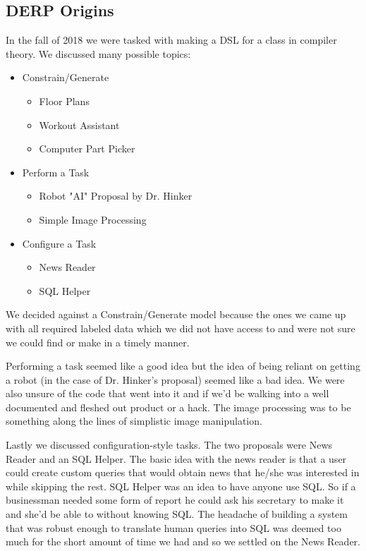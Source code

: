 \documentclass{article}
\begin{document}
\subsection{DERP Origins}
In the fall of 2018 we were tasked with making a DSL for a class in compiler theory. We discussed many possible topics:
\begin{itemize}
    \item{Constrain/Generate}
    \begin{itemize}
        \item{Floor Plans}
        \item{Workout Assistant}
        \item{Computer Part Picker}
    \end{itemize}
    \item{Perform a Task}
    \begin{itemize}
        \item{Robot "AI" Proposal by Dr. Hinker}
        \item{Simple Image Processing}
    \end{itemize}
    \item{Configure a Task}
    \begin{itemize}
        \item{News Reader}
        \item{SQL Helper}        
    \end{itemize}
\end{itemize}

We decided against a Constrain/Generate model because the ones we came up with all required labeled data which we did not have access to and were not sure we could find or make in a timely manner.

Performing a task seemed like a good idea but the idea of being reliant on getting a robot (in the case of Dr. Hinker's proposal) seemed like a bad idea. We were also unsure of the code that went into it and if we'd be walking into a well documented and fleshed out product or a hack. The image processing was to be something along the lines of simplistic image manipulation.

Lastly we discussed configuration-style tasks. The two proposals were News Reader and an SQL Helper. The basic idea with the news reader is that a user could create custom queries that would obtain news that he/she was interested in while skipping the rest. SQL Helper was an idea to have anyone use SQL. So if a businessman needed some form of report he could ask his secretary to make it and she'd be able to without knowing SQL. The headache of building a system that was robust enough to translate human queries into SQL was deemed too much for the short amount of time we had and so we settled on the News Reader.
\end{document}
